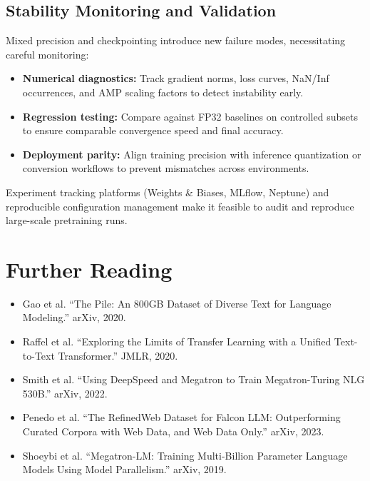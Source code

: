 \documentclass{article}
\begin{document}
\subsection{Stability Monitoring and Validation}
Mixed precision and checkpointing introduce new failure modes, necessitating careful monitoring:
\begin{itemize}
  \item \textbf{Numerical diagnostics:} Track gradient norms, loss curves, NaN/Inf occurrences, and AMP scaling factors to detect instability early.
  \item \textbf{Regression testing:} Compare against FP32 baselines on controlled subsets to ensure comparable convergence speed and final accuracy.
  \item \textbf{Deployment parity:} Align training precision with inference quantization or conversion workflows to prevent mismatches across environments.
\end{itemize}
Experiment tracking platforms (Weights \& Biases, MLflow, Neptune) and reproducible configuration management make it feasible to audit and reproduce large-scale pretraining runs.

\section*{Further Reading}
\begin{itemize}
  \item Gao et al. ``The Pile: An 800GB Dataset of Diverse Text for Language Modeling.'' arXiv, 2020.
  \item Raffel et al. ``Exploring the Limits of Transfer Learning with a Unified Text-to-Text Transformer.'' JMLR, 2020.
  \item Smith et al. ``Using DeepSpeed and Megatron to Train Megatron-Turing NLG 530B.'' arXiv, 2022.
  \item Penedo et al. ``The RefinedWeb Dataset for Falcon LLM: Outperforming Curated Corpora with Web Data, and Web Data Only.'' arXiv, 2023.
  \item Shoeybi et al. ``Megatron-LM: Training Multi-Billion Parameter Language Models Using Model Parallelism.'' arXiv, 2019.
\end{itemize}
\end{document}
